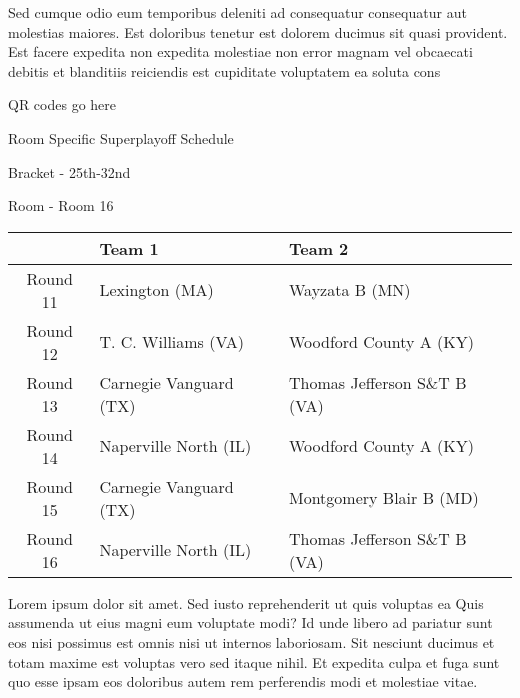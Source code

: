\documentclass{article}%
\begin{document}
\newline%
    Sed cumque odio eum temporibus deleniti ad consequatur consequatur aut molestias maiores. Est doloribus tenetur est dolorem ducimus sit quasi provident. Est facere expedita non expedita molestiae non error magnam vel obcaecati debitis et blanditiis reiciendis est cupiditate voluptatem ea soluta cons%
\vspace*{140pt}%
\begin{center}%
\begin{Huge}%
QR codes go here%
\end{Huge}%
\end{center}%
\newpage%
\begin{center}%
\begin{Huge}%
Room Specific Superplayoff Schedule%
\end{Huge}%
\vspace*{8pt}%
\linebreak%
\begin{Large}%
Bracket {-} 25th{-}32nd%
\end{Large}%
\vspace*{8pt}%
\linebreak%
\vspace*{8pt}%
\begin{Large}%
Room {-} Room 16%
\end{Large}%
\end{center}%
%
\begin{tabularx}{\textwidth}{|c|Y|Y|}%
\hline%
&Team 1&Team 2\\%
\hline%
Round 11&Lexington (MA)&Wayzata B (MN)\\%
Round 12&T. C. Williams (VA)&Woodford County A (KY)\\%
Round 13&Carnegie Vanguard (TX)&Thomas Jefferson S\&T B (VA)\\%
Round 14&Naperville North (IL)&Woodford County A (KY)\\%
Round 15&Carnegie Vanguard (TX)&Montgomery Blair B (MD)\\%
Round 16&Naperville North (IL)&Thomas Jefferson S\&T B (VA)\\%
\hline%
\end{tabularx}%
\vspace*{8pt}%
\newline%
    Lorem ipsum dolor sit amet. Sed iusto reprehenderit ut quis voluptas ea Quis assumenda ut eius magni eum voluptate modi? Id unde libero ad pariatur sunt eos nisi possimus est omnis nisi ut internos laboriosam. Sit nesciunt ducimus et totam maxime est voluptas vero sed itaque nihil. Et expedita culpa et fuga sunt quo esse ipsam eos doloribus autem rem perferendis modi et molestiae vitae.\newline%
\end{document}
